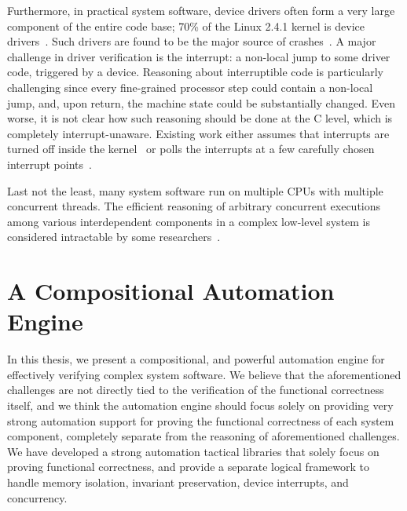 Furthermore, 
in practical system software, device drivers often form a very large component
of the entire code base; 70\% of the Linux 2.4.1 kernel is
device drivers~\cite{Chou:2001}.
Such drivers are found
to be the major source of crashes~\cite{Chou:2001,Ball:2006,Ganapathi:2006}.
A major challenge in driver verification is the interrupt: a non-local
jump to some driver code, triggered by a device. 
Reasoning about interruptible code is
particularly challenging since every fine-grained processor step
could contain a non-local jump, and, upon return, the machine state
could be substantially changed. Even worse, it is not clear how such
reasoning should be done at the C level, which is completely
interrupt-unaware. Existing work either assumes that interrupts are
turned off inside the kernel~\cite{dscal15,verisoft07} or polls the
interrupts at a few carefully chosen interrupt points~\cite{klein14}.

Last not the least, many system software run on multiple CPUs with
multiple concurrent threads.   
The efficient reasoning of arbitrary concurrent executions among various
interdependent components in a complex low-level system is considered
intractable by some researchers~\cite{vontessin13,peters15,Chong:2016:RNW:3040225}. 

\section{A Compositional Automation Engine} 

In this thesis, we present a compositional, and powerful automation engine for effectively
verifying complex system software. 
We believe that the aforementioned challenges are not directly tied to the verification
of the functional correctness itself, and we think the automation engine should focus solely
on providing
very strong automation support for proving the functional correctness of each system component,
completely separate from the reasoning of aforementioned challenges.
We have developed a strong automation tactical libraries that solely focus on
proving functional correctness, and provide a separate logical framework to handle
memory isolation, invariant preservation, device interrupts, and concurrency.

